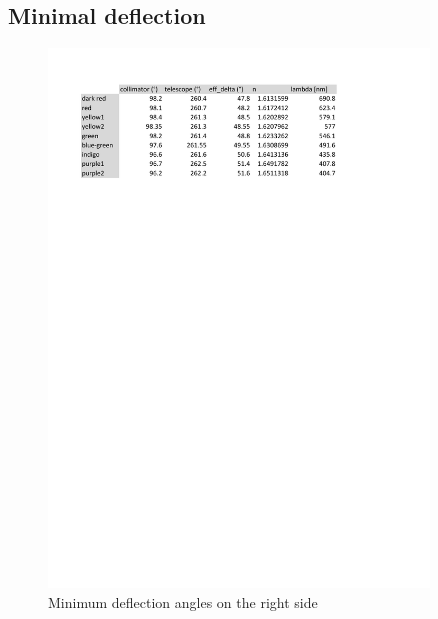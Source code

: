 \documentclass{scrreprt}
\begin{document}
\subsection{Minimal deflection}
\begin{figure}[H]
	\centering
  \includegraphics[width=0.9\textwidth]{diag/right.pdf}
	\caption{Minimum deflection angles on the right side}
	\label{fig:right}
\end{figure}
\end{document}
